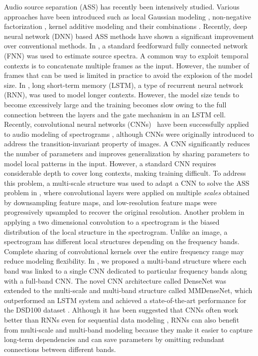 \documentclass{article}
\begin{document}
Audio source separation (ASS) has recently been intensively studied. Various approaches have been introduced such as local Gaussian modeling \cite{DuongVG10, FitzgeraldLB16}, non-negative factorization \cite{LiutkusFB15, Roux15, MitsufujiKS16}, kernel additive modeling \cite{LiutkusFRPD14} and their combinations \cite{OzerovF10, LiutkusFR15, FitzgeraldLB162}. 
Recently, deep neural network (DNN) based ASS methods have shown a significant improvement
over conventional methods. 
In \cite{Nugraha15, Uhlich15}, a standard feedforward fully connected network (FNN) was used to estimate source spectra. A common way to exploit temporal contexts is to concatenate multiple frames as the input. However, the number of frames that can be used is limited in practice to avoid the explosion of the model size.
In \cite{Uhlich17}, long short-term memory (LSTM), a type of recurrent neural network (RNN), was used to model longer contexts. However, the model size tends to become excessively large and the training becomes slow owing to the full connection between the layers and the gate mechanism in an LSTM cell.
Recently, convolutional neural networks (CNNs)~ have been successfully applied to audio modeling of spectrograms \cite{Sercu2015, Takahashi2016, Korzeniowski16, Takahashi2017AENet}, although CNNs were originally introduced to address the transition-invariant property of images. A CNN significantly reduces the number of parameters and improves generalization by sharing parameters to model local patterns in the input.  However, a standard CNN requires considerable depth to cover long contexts, making training difficult. To address this problem, a multi-scale structure was used to adapt a CNN to solve the ASS problem in \cite{Jansson17, Takahashi17MMDense}, where convolutional layers were applied on multiple {\it scales} obtained by downsampling feature maps, and low-resolution feature maps were progressively upsampled to recover the original resolution. Another problem in applying a two dimensional convolution to a spectrogram is the biased distribution of the local structure in the spectrogram. Unlike an image, a spectrogram has different local structures depending on the frequency bands. Complete sharing of convolutional kernels over the entire frequency range may reduce modeling flexibility. In \cite{Takahashi17MMDense}, we proposed a multi-band structure where each band was linked to a single CNN dedicated to particular frequency bands  along with a full-band CNN. The novel CNN architecture called DenseNet was extended to the multi-scale and multi-band structure called MMDenseNet, which outperformed an  LSTM system and achieved a state-of-the-art performance for the DSD100 dataset \cite{Liutkus17}.
Although it has been suggested that CNNs often work better than RNNs even for sequential data modeling \cite{Bai18, Takahashi17MMDense}, RNNs can also benefit from multi-scale and multi-band modeling because
they make it easier to capture long-term dependencies and can save parameters by omitting redundant connections between different bands.
\end{document}
